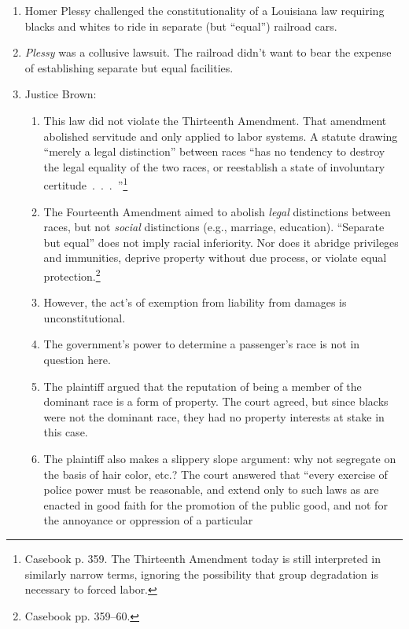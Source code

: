 \begin{enumerate}
    \item Homer Plessy challenged the constitutionality of a Louisiana law 
    requiring blacks and whites to ride in separate (but ``equal'') railroad 
    cars.
    \item \emph{Plessy} was a collusive lawsuit. The railroad didn't want to 
    bear the expense of establishing separate but equal facilities.
    \item Justice Brown:
    \begin{enumerate}
        \item This law did not violate the Thirteenth Amendment. That 
        amendment abolished servitude and only applied to labor systems. A 
        statute drawing ``merely a legal distinction'' between races ``has no 
        tendency to destroy the legal equality of the two races, or 
        reestablish a state of involuntary 
        certitude~.~.~.~''\footnote{Casebook p. 359. The Thirteenth Amendment 
        today is still interpreted in similarly narrow terms, ignoring the 
        possibility that group degradation is necessary to forced labor.}
        \item The Fourteenth Amendment aimed to abolish \emph{legal} 
        distinctions between races, but not \emph{social} distinctions (e.g., 
        marriage, education).  ``Separate but equal'' does not imply racial 
        inferiority. Nor does it abridge privileges and immunities, deprive 
        property without due process, or violate equal 
        protection.\footnote{Casebook pp. 359--60.}
        \item However, the act's of exemption from liability from damages is 
        unconstitutional.  
        \item The government's power to determine a passenger's race is not in 
        question here.
        \item The plaintiff argued that the reputation of being a member of the 
        dominant race is a form of property. The court agreed, but since blacks 
        were not the dominant race, they had no property interests at stake in 
        this case.
        \item The plaintiff also makes a slippery slope argument: why not 
        segregate on the basis of hair color, etc.? The court answered that 
        ``every exercise of police power must be reasonable, and extend only to 
        such laws as are enacted in good faith for the promotion of the public 
        good, and not for the annoyance or oppression of a particular 

\end{enumerate}
\end{enumerate}
